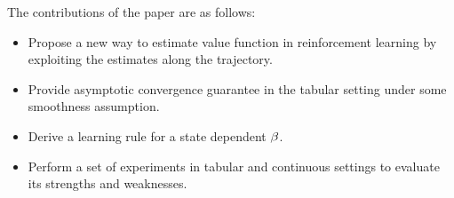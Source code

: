 The contributions of the paper are as follows:
\begin{itemize}
    \setlength\itemsep{0.1em}
    \item Propose a new way to estimate value function in reinforcement learning by exploiting the estimates along the trajectory.
    \item Provide asymptotic convergence guarantee in the tabular setting under some smoothness assumption.
    \item Derive a learning rule for a state dependent $\beta$.
    \item Perform a set of experiments in tabular and continuous settings to evaluate its strengths and weaknesses.
\end{itemize}





